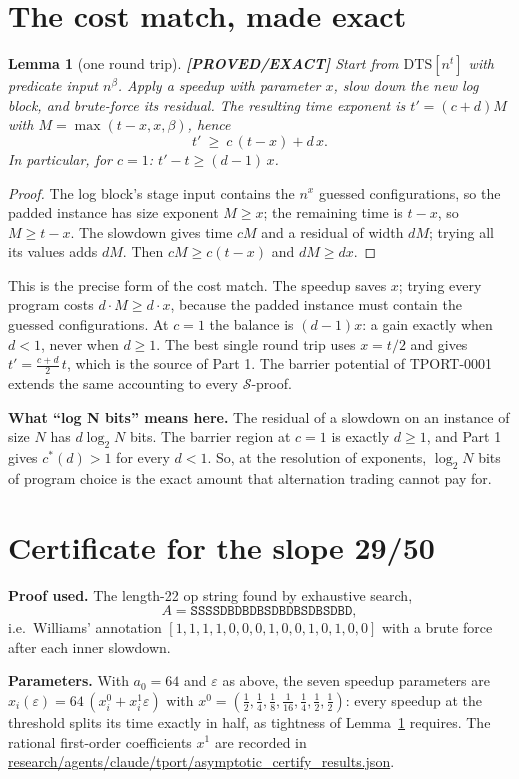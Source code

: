 \documentclass[11pt]{article}
\newtheorem{lemma}[theorem]{Lemma}
\theoremstyle{remark}
\newcommand{\DTS}{\mathrm{DTS}}
\newcommand{\status}[1]{\textbf{[#1]}}
\begin{document}
\section{The cost match, made exact}

\begin{lemma}[one round trip]\label{lem:round} \status{PROVED/EXACT}
Start from $\DTS[n^t]$ with predicate input $n^\beta$. Apply a speedup with parameter $x$, slow down the new
log block, and brute-force its residual. The resulting time exponent is
$t'=(c+d)M$ with $M=\max(t-x,x,\beta)$, hence
\[
t'\ \ge\ c\,(t-x)+d\,x .
\]
In particular, for $c=1$: $t'-t\ge(d-1)\,x$.
\end{lemma}
\begin{proof}
The log block's stage input contains the $n^{x}$ guessed configurations, so the padded instance has size
exponent $M\ge x$; the remaining time is $t-x$, so $M\ge t-x$. The slowdown gives time $cM$ and a residual
of width $dM$; trying all its values adds $dM$. Then $cM\ge c(t-x)$ and $dM\ge dx$.
\end{proof}

\noindent This is the precise form of the cost match. The speedup saves $x$; trying every program costs
$d\cdot M\ge d\cdot x$, because the padded instance must contain the guessed configurations. At $c=1$ the
balance is $(d-1)x$: a gain exactly when $d<1$, never when $d\ge1$. The best single round trip uses
$x=t/2$ and gives $t'=\tfrac{c+d}{2}\,t$, which is the source of Part 1. The barrier potential of TPORT-0001
extends the same accounting to every $\mathcal S$-proof.

\noindent\textbf{What ``log N bits'' means here.} The residual of a slowdown on an instance of size $N$ has
$d\log_2N$ bits. The barrier region at $c=1$ is exactly $d\ge1$, and Part 1 gives $c^*(d)>1$ for every
$d<1$. So, at the resolution of exponents, $\log_2 N$ bits of program choice is the exact amount that
alternation trading cannot pay for.

\section{Certificate for the slope 29/50}\label{sec:cert}

\noindent\textbf{Proof used.} The length-22 op string found by exhaustive search,
\[
A=\texttt{SSSSDBDBDBSDBDBSDBSDBD},
\]
i.e.\ Williams' annotation $[1,1,1,1,0,0,0,1,0,0,1,0,1,0,0]$ with a brute force after each inner slowdown.

\noindent\textbf{Parameters.} With $a_0=64$ and $\varepsilon$ as above, the seven speedup parameters are
$x_i(\varepsilon)=64\,(x_i^{0}+x_i^{1}\varepsilon)$ with
$x^{0}=(\tfrac12,\tfrac14,\tfrac18,\tfrac1{16},\tfrac14,\tfrac12,\tfrac12)$: every speedup at the threshold
splits its time exactly in half, as tightness of Lemma~\ref{lem:round} requires. The rational first-order
coefficients $x^{1}$ are recorded in \url{research/agents/claude/tport/asymptotic_certify_results.json}.
\end{document}
